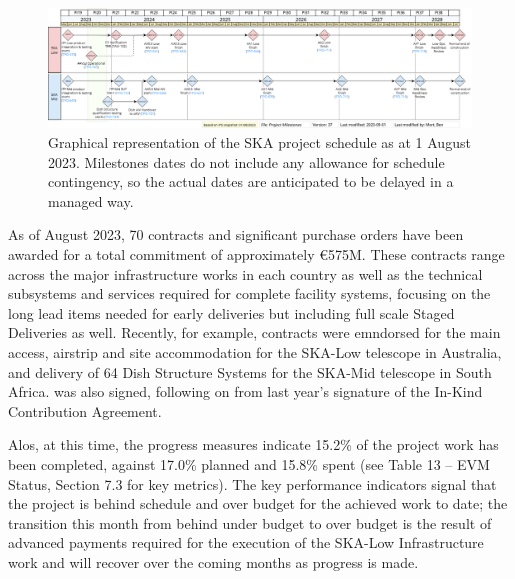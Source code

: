 \documentclass[a4paper,
               biblatex,     %
               keeplastbox,   %
               ]{jacow}
\begin{document}
 \begin{figure}[tb]
	\centering
	  \includegraphics[width=\textwidth]{FR1BCO03f2.png}
	\caption{
		Graphical representation of the SKA project schedule as at 1 August 2023. Milestones dates do not include any allowance for schedule contingency, so the actual dates are anticipated to be delayed in a managed way.
	}
	\label{fig:ska-timeline}
  \end{figure}

As of August 2023, 70 contracts and significant purchase orders have been awarded for a total commitment of approximately €575M. These contracts range across the major infrastructure works in each country as well as the technical subsystems and services required for complete facility systems, focusing on the long lead items needed for early deliveries but including full scale Staged Deliveries as well. Recently, for example, contracts were emndorsed for the main access, airstrip and site accommodation for the SKA-Low telescope in Australia, and delivery of 64 Dish Structure Systems for the SKA-Mid telescope in South Africa. was also signed, following on from last year’s signature of the In-Kind Contribution Agreement.

Alos, at this time, the progress measures indicate 15.2\% of the project work has been completed, against 17.0\% planned and 15.8\% spent (see Table 13 – EVM Status, Section 7.3 for key metrics).  The key performance indicators signal that the project is behind schedule and over budget for the achieved work to date; the transition this month from behind under budget to over budget is the result of advanced payments required for the execution of the SKA-Low Infrastructure work and will recover over the coming months as progress is made.
\end{document}
